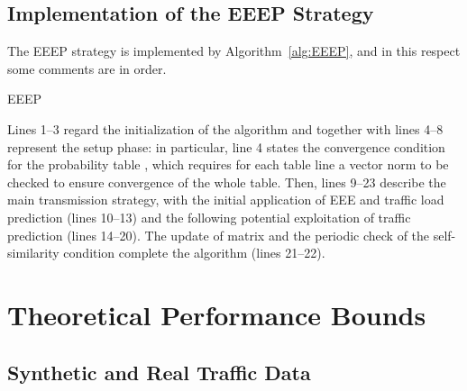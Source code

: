 \documentclass[journal,10pt,twoside,final]{IEEEtran}
\begin{document}
\subsection{Implementation of the EEEP Strategy}
\label{subsec:EEEP-impl}

The EEEP strategy is implemented by Algorithm~\ref{alg:EEEP}, and in this respect some comments are in order.

\begin{algorithm}[ht]
 \caption{EEEP}
 \begin{algorithmic}[1]
 \ENDWHILE 	
 \WHILE {}
       \ENDWHILE
  \ELSE 
 \ENDIF 
{}
 \ENDWHILE
 \end{algorithmic}
 \label{alg:EEEP}
\end{algorithm}
 
Lines 1--3 regard the initialization of the algorithm and together with lines 4--8 represent the setup phase: in particular, line 4 states the convergence condition for the probability table , which requires for each table line a vector norm to be checked to ensure convergence of the whole table. 
Then, lines 9--23 describe the main transmission strategy, with the initial application of EEE and traffic load prediction (lines 10--13) and the following potential exploitation of traffic prediction (lines 14--20).
The update of matrix  and the periodic check of the self-similarity condition complete the algorithm (lines 21--22).


\section{Theoretical Performance Bounds}
\label{discussion}

\subsection{Synthetic and Real Traffic Data}
\label{sec:synth&real}
\end{document}
